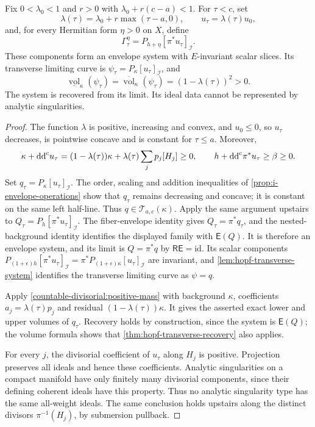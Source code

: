 \begin{example}\label{ex:hopf-nonanalytic-recovery}
Fix $0<\lambda_0<1$ and $r>0$ with $\lambda_0+r(c-a)<1$. For $\tau<c$, set
\[
 \lambda(\tau)=\lambda_0+r\max(\tau-a,0),\qquad
 u_\tau=\lambda(\tau)u_0,
\]
and, for every Hermitian form $\eta>0$ on $X$, define
\[
 \Gamma_\tau^\eta=P_{h+\eta}[\pi^*u_\tau]_{\mathcal I}.
\]
These components form an envelope system with $E$-invariant scalar slices. Its transverse limiting curve is
$\psi_\tau=P_\kappa[u_\tau]_{\mathcal I}$, and
\[
 \underline{\operatorname{vol}}_\kappa(\psi_\tau)
 =\overline{\operatorname{vol}}_\kappa(\psi_\tau)
 =(1-\lambda(\tau))^2>0.
\]
The system is recovered from its limit. Its ideal data cannot be represented by analytic singularities.
\end{example}
\begin{proof}
The function $\lambda$ is positive, increasing and convex, and $u_0\leq0$, so $u_\tau$ decreases, is pointwise concave and is constant for $\tau\leq a$. Moreover,
\[
 \kappa+\mathrm{dd}^{\mathrm{c}} u_\tau
       =(1-\lambda(\tau))\kappa
                         +\lambda(\tau)\sum_jp_j[H_j]\geq0,
 \qquad
 h+\mathrm{dd}^{\mathrm{c}}\pi^*u_\tau\geq\beta\geq0.
\]
Set $q_\tau=P_\kappa[u_\tau]_{\mathcal I}$. The order, scaling and addition inequalities of \cref{prop:i-envelope-operations} show that $q_\tau$ remains decreasing and concave; it is constant on the same left half-line. Thus $q\in\mathscr T_{a,c}(\kappa)$. Apply the same argument upstairs to $Q_\tau=P_h[\pi^*u_\tau]_{\mathcal I}$. The fiber-envelope identity gives $Q_\tau=\pi^*q_\tau$, and the nested-background identity identifies the displayed family with $\mathsf E(Q)$. It is therefore an envelope system, and its limit is $Q=\pi^*q$ by $\mathsf R\mathsf E=\mathrm{id}$. Its scalar components $P_{(1+\epsilon)h}[\pi^*u_\tau]_{\mathcal I}=\pi^*P_{(1+\epsilon)\kappa}[u_\tau]_{\mathcal I}$ are invariant, and \cref{lem:hopf-transverse-system} identifies the transverse limiting curve as $\psi=q$.

Apply \cref{countable-divisorial:positive-mass} with background $\kappa$, coefficients $a_j=\lambda(\tau)p_j$ and residual $(1-\lambda(\tau))\kappa$. It gives the asserted exact lower and upper volumes of $q_\tau$. Recovery holds by construction, since the system is $\mathsf E(Q)$; the volume formula shows that \cref{thm:hopf-transverse-recovery} also applies.

For every $j$, the divisorial coefficient of $u_\tau$ along $H_j$ is positive. Projection preserves all ideals and hence these coefficients. Analytic singularities on a compact manifold have only finitely many divisorial components, since their defining coherent ideals have this property. Thus no analytic singularity type has the same all-weight ideals. The same conclusion holds upstairs along the distinct divisors $\pi^{-1}(H_j)$, by submersion pullback.
\end{proof}

